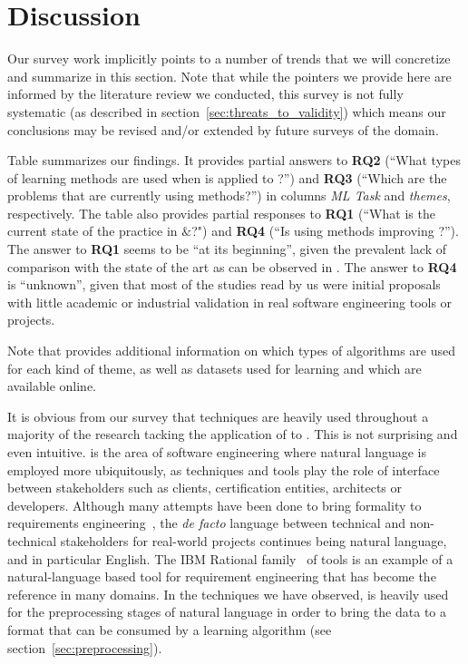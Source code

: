 \section{Discussion}
\label{sec:discussion}

Our survey work implicitly points to a number of trends that we will
concretize and summarize in this section. Note that while the pointers we
provide here are informed by the literature review we conducted, this survey is
not fully systematic (as described in section~\ref{sec:threats_to_validity}) which
means our conclusions may be revised and/or extended by future surveys of the
domain.

Table  summarizes our findings. It provides partial answers to
\textbf{RQ2} (``What types of learning methods are used when \ML is applied to
\RE?'') and \textbf{RQ3} (``Which are the \RE problems that are currently using
\ML methods?'') in columns \emph{ML Task} and  \emph{themes}, respectively.
The table also provides partial responses to \textbf{RQ1} (``What is the current
state of the practice in \ML${\&}$\RE?") and \textbf{RQ4} (``Is using \ML
methods improving \RE?''). The answer to \textbf{RQ1} seems to be ``at its
beginning'', given the prevalent lack of comparison with the state of the art
as can be observed in . The answer to \textbf{RQ4} is
``unknown'', given that most of the studies read by us were initial proposals
with little academic or industrial validation in real software engineering tools or projects.

Note that  provides additional information on which types of
algorithms are used for each kind of theme, as well as datasets used for
learning and which are available online.

It is obvious from our survey that \NLP techniques are heavily used
throughout a majority of the research tacking the application of \ML to
\RE. This is not surprising and even intuitive. \RE is the area of software
engineering where natural language is employed more ubiquitously, as \RE
techniques and tools play the role of interface between stakeholders such as
clients, certification entities, architects or developers. Although many
attempts have been done to bring formality to requirements
engineering~\cite{Teufl17,LucioRCA16}, the \emph{de facto} language between
technical and non-technical stakeholders for real-world projects continues being
natural language, and in particular English.
The IBM Rational \DOORS family~\cite{doors} of tools is an example
of a natural-language based tool for requirement engineering that has become the
reference in many domains. In the techniques we have observed, \NLP is heavily
used for the preprocessing stages of natural language in order to bring the data to a format
that can be consumed by a learning algorithm (see
section~\ref{sec:preprocessing}).
 
